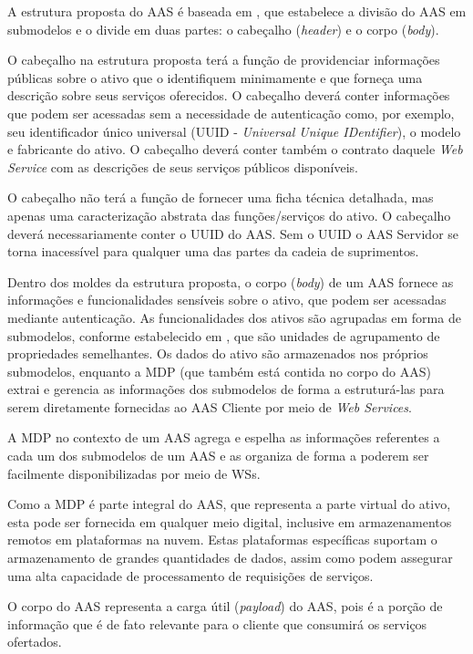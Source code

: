 A estrutura proposta do AAS é baseada em , que estabelece a divisão do AAS em submodelos e o divide em duas partes: o cabeçalho (\textit{header}) e o corpo (\textit{body}).

O cabeçalho na estrutura proposta terá a função de providenciar informações públicas sobre o ativo que o identifiquem minimamente e que forneça uma descrição sobre seus serviços oferecidos. O cabeçalho deverá conter informações que podem ser acessadas sem a necessidade de autenticação como, por exemplo, seu identificador único universal (UUID - \textit{Universal Unique IDentifier}), o modelo e fabricante do ativo. O cabeçalho deverá conter também o contrato daquele \textit{Web Service} com as descrições de seus serviços públicos disponíveis.

O cabeçalho não terá a função de fornecer uma ficha técnica detalhada, mas apenas uma caracterização abstrata das funções/serviços do ativo. O cabeçalho deverá necessariamente conter o UUID do AAS. Sem o UUID o AAS Servidor se torna inacessível para qualquer uma das partes da cadeia de suprimentos.

Dentro dos moldes da estrutura proposta, o corpo (\textit{body}) de um AAS fornece as informações e funcionalidades sensíveis sobre o ativo, que podem ser acessadas mediante autenticação. As funcionalidades dos ativos são agrupadas em forma de submodelos, conforme estabelecido em , que são unidades de agrupamento de propriedades semelhantes. Os dados do ativo são armazenados nos próprios submodelos, enquanto a MDP (que também está contida no corpo do AAS) extrai e gerencia as informações dos submodelos de forma a estruturá-las para serem diretamente fornecidas ao AAS Cliente por meio de \textit{Web Services}.

A MDP no contexto de um AAS agrega e espelha as informações referentes a cada um dos submodelos de um AAS e as organiza de forma a poderem ser facilmente disponibilizadas por meio de WSs.

Como a MDP é parte integral do AAS, que representa a parte virtual do ativo, esta pode ser fornecida em qualquer meio digital, inclusive em armazenamentos remotos em plataformas na nuvem. Estas plataformas específicas suportam o armazenamento de grandes quantidades de dados, assim como podem assegurar uma alta capacidade de processamento de requisições de serviços.

O corpo do AAS representa a carga útil (\textit{payload}) do AAS, pois é a porção de informação que é de fato relevante para o cliente que consumirá os serviços ofertados.

